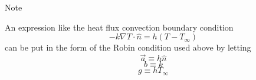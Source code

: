 \documentclass{article}
\begin{document}
Note

An expression like the heat flux convection boundary condition
\begin{equation*}
-k\nabla T\cdot\hat{n} = h(T - T_\infty)
\end{equation*}
can be put in the form of the Robin condition used above by letting
\begin{equation*}
\vec{a} \equiv h \hat{n}
\end{equation*}
\begin{equation*}
b \equiv k
\end{equation*}
\begin{equation*}
g \equiv h T_\infty
\end{equation*}
\end{document}
